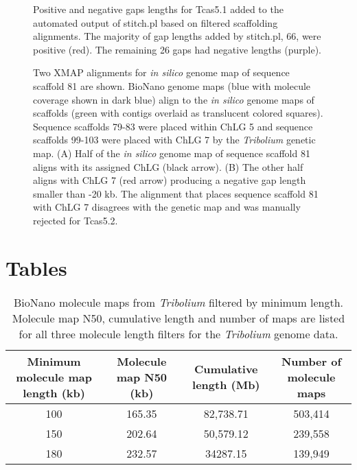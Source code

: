 \documentclass{bmcart}
\begin{document}
\begin{backmatter}
\begin{figure}[h!]
	\caption{
		Positive and negative gaps lengths for Tcas5.1 added to the automated output of stitch.pl based on filtered scaffolding alignments. The majority of gap lengths added by stitch.pl, 66, were positive (red). The remaining 26 gaps had negative lengths (purple).}
      \end{figure}                      
\begin{figure}[h!]
	\caption{
		Two XMAP alignments for \textit{in silico} genome map of sequence scaffold 81 are shown. BioNano genome maps (blue with molecule coverage shown in dark blue) align to the \textit{in silico} genome maps of scaffolds (green with contigs overlaid as translucent colored squares). Sequence scaffolds 79-83 were placed within ChLG 5 and sequence scaffolds 99-103 were placed with ChLG 7 by the \textit{Tribolium} genetic map. (A) Half of the \textit{in silico} genome map of sequence scaffold 81 aligns with its assigned ChLG (black arrow). (B) The other half aligns with ChLG 7 (red arrow) producing a negative gap length smaller than -20 kb. The alignment that places sequence scaffold 81 with ChLG 7 disagrees with the genetic map and was manually rejected for Tcas5.2.}
      \end{figure}            




\section*{Tables}

\begin{table}[h!]
\caption{BioNano molecule maps from \textit{Tribolium} filtered by minimum length. Molecule map N50, cumulative length and number of maps are listed for all three molecule length filters for the \textit{Tribolium} genome data.}
      \begin{tabular}{cccc}
        \hline
         Minimum molecule map length (kb) & Molecule map N50 (kb) & Cumulative length (Mb) & Number of molecule maps\\ \hline
        100 & 165.35 & 82,738.71 & 503,414 \\
        150 & 202.64 & 50,579.12 & 239,558 \\ 
        180 & 232.57 & 34287.15 & 139,949 \\ \hline  
      \end{tabular}
\end{table}


\end{backmatter}
\end{document}
